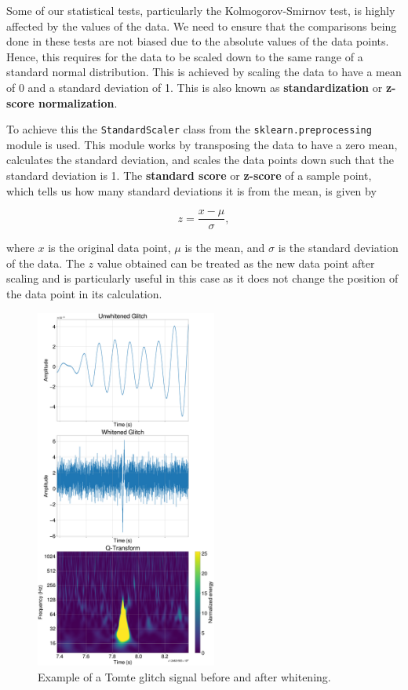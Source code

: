 \documentclass[12pt]{article}
\begin{document}
\noindent Some of our statistical tests, particularly the Kolmogorov-Smirnov test, is highly affected by the values of the data. We need to ensure that the comparisons being done in these tests are not biased due to the absolute values of the data points. Hence, this requires for the data to be scaled down to the same range of a standard normal distribution. This is achieved by scaling the data to have a mean of 0 and a standard deviation of 1. This is also known as \textbf{standardization} or \textbf{z-score normalization}.

\medskip
\noindent To achieve this the \texttt{StandardScaler} class from the \texttt{sklearn.preprocessing} module is used. This module works by transposing the data to have a zero mean, calculates the standard deviation, and scales the data points down such that the standard deviation is 1. The \textbf{standard score} or \textbf{z-score} of a sample point, which tells us how many standard deviations it is from the mean, is given by

\begin{equation}
    z = \frac{x - \mu}{\sigma},
    \label{eq:scaling_formula}
\end{equation}

\medskip
\noindent where $x$ is the original data point, $\mu$ is the mean, and $\sigma$ is the standard deviation of the data. The $z$ value obtained can be treated as the new data point after scaling and is particularly useful in this case as it does not change the position of the data point in its calculation.

\begin{figure}[H]
  \centering
  \includegraphics[width=0.53\textwidth]{images/sample_plot.pdf}
  \caption{Example of a Tomte glitch signal before and after whitening.}
  \label{fig:sampletomte}
\end{figure}
\end{document}
